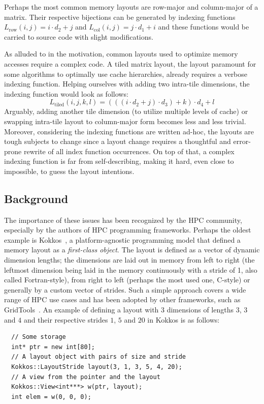 Perhaps the most common memory layouts are row-major and column-major of a matrix. Their respective bijections can be generated by indexing functions $L_{\text{row}}(i,j) = i \cdot d_2 + j$ and $L_{\text{col}}(i,j) = j \cdot d_1 + i$ and these functions would be carried to source code with slight modifications. 

As alluded to in the motivation, common layouts used to optimize memory accesses require a complex code. A tiled matrix layout, the layout paramount for some algorithms to optimally use cache hierarchies, already requires a verbose indexing function. Helping ourselves with adding two intra-tile dimensions, the indexing function would look as follows:
$$L_{\text{tiled}}(i,j,k,l) = (((i \cdot d_2 + j) \cdot d_3) + k) \cdot d_4 + l$$
Arguably, adding another tile dimension (to utilize multiple levels of cache) or swapping intra-tile layout to column-major form becomes less and less trivial. Moreover, considering the indexing functions are written ad-hoc, the layouts are tough subjects to change since a layout change requires a thoughtful and error-prone rewrite of all index function occurrences. On top of that, a complex indexing function is far from self-describing, making it hard, even close to impossible, to guess the layout intentions.

\subsection{Background}

The importance of these issues has been recognized by the HPC community, especially by the authors of HPC programming frameworks. Perhaps the oldest example is Kokkos~\cite{CARTEREDWARDS20143202}, a platform-agnostic programming model that defined a memory layout as a \emph{first-class object}. The layout is defined as a vector of dynamic dimension lengths; the dimensions are laid out in memory from left to right (the leftmost dimension being laid in the memory continuously with a stride of 1, also called Fortran-style), from right to left (perhaps the most used one, C-style) or generally by a custom vector of strides. Such a simple approach covers a wide range of HPC use cases and has been adopted by other frameworks, such as GridTools~\cite{AFANASYEV2021100707}. An example of defining a layout with $3$ dimensions of lengths $3$, $3$ and $4$ and their respective strides $1$, $5$ and $20$ in Kokkos is as follows:

\begin{verbatim}
  // Some storage
  int* ptr = new int[80];
  // A layout object with pairs of size and stride
  Kokkos::LayoutStride layout(3, 1, 3, 5, 4, 20);
  // A view from the pointer and the layout
  Kokkos::View<int***> w(ptr, layout);
  int elem = w(0, 0, 0);
\end{verbatim}


